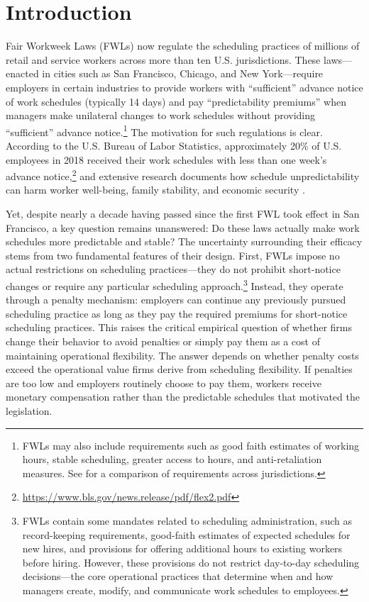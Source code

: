\documentclass[letterpaper,11pt,leqno]{article}
\theoremstyle{paper}
\begin{document}
\section{Introduction} \label{sec:intro}
Fair Workweek Laws (FWLs) now regulate the scheduling practices of millions of retail and service workers across more than ten U.S. jurisdictions. These laws—enacted in cities such as San Francisco, Chicago, and New York—require employers in certain industries to provide workers with ``sufficient'' advance notice of work schedules (typically 14 days) and pay ``predictability premiums'' when managers make unilateral changes to work schedules without providing ``sufficient'' advance notice.\footnote{FWLs may also include requirements such as good faith estimates of working hours, stable scheduling, greater access to hours, and anti-retaliation measures. See \cite{fw_info} for a comparison of requirements across jurisdictions.} The motivation for such regulations is clear. According to the U.S. Bureau of Labor Statistics, approximately 20\% of U.S. employees in 2018 received their work schedules with less than one week's advance notice,\footnote{\url{https://www.bls.gov/news.release/pdf/flex2.pdf}} and extensive research documents how schedule unpredictability can harm worker well-being, family stability, and economic security \citep{henly_lambert_2014, clasp_2015, Lambert218, seattle_pp, ananant_emeryville}.

Yet, despite nearly a decade having passed since the first FWL took effect in San Francisco, a key question remains unanswered: Do these laws actually make work schedules more predictable and stable? The uncertainty surrounding their efficacy stems from two fundamental features of their design. First, FWLs impose no actual restrictions on scheduling practices—they do not prohibit short-notice changes or require any particular scheduling approach.\footnote{FWLs contain some mandates related to scheduling administration, such as record-keeping requirements, good-faith estimates of expected schedules for new hires, and provisions for offering additional hours to existing workers before hiring. However, these provisions do not restrict day-to-day scheduling decisions—the core operational practices that determine when and how managers create, modify, and communicate work schedules to employees.} Instead, they operate through a penalty mechanism: employers can continue any previously pursued scheduling practice as long as they pay the required premiums for short-notice scheduling practices. This raises the critical empirical question of whether firms change their behavior to avoid penalties or simply pay them as a cost of maintaining operational flexibility. The answer depends on whether penalty costs exceed the operational value firms derive from scheduling flexibility. If penalties are too low and employers routinely choose to pay them, workers receive monetary compensation rather than the predictable schedules that motivated the legislation. 
\end{document}
